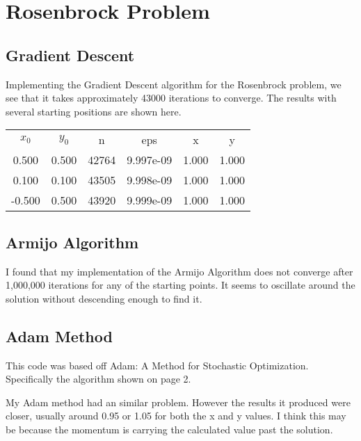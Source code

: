 \documentclass{article}
\begin{document}
\section{Rosenbrock Problem}


\subsection{Gradient Descent}

Implementing the Gradient Descent algorithm for the Rosenbrock problem, we see that it takes approximately 43000 iterations to converge. The results with several starting positions are shown here.

\begin{center}
\begin{tabular}{cccccc}
$x_0$ & $y_0$ & n & eps & x & y\\
    0.500 &     0.500 & 42764 & 9.997e-09 &     1.000 &     1.000\\ 
    0.100 &     0.100 & 43505 & 9.998e-09 &     1.000 &     1.000\\ 
   -0.500 &     0.500 & 43920 & 9.999e-09 &     1.000 &     1.000
\end{tabular}

\end{center}

\subsection{Armijo Algorithm}

I found that my implementation of the Armijo Algorithm does not converge after 1,000,000 iterations for any of the starting points. It seems to oscillate around the solution without descending enough to find it.

\subsection{Adam Method}
This code was based off Adam: A Method for Stochastic Optimization. Specifically the algorithm shown on page 2. 

My Adam method had an similar problem. However the results it produced were closer, usually around 0.95 or 1.05 for both the x and y values. I think this may be because the momentum is carrying the calculated value past the solution.
\end{document}
